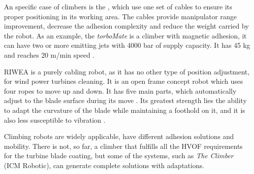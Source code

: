 


An specific case of climbers is the , which use one set of
cables to ensure its proper positioning in its working area. The cables provide
manipulator range improvement, decrease the adhesion complexity and reduce the
weight carried by the robot. As an example, the \textit{torboMate} is a climber
with magnetic adhesion, it can have two or more emitting jets with 4000 bar of
supply capacity. It has 45 kg and reaches 20 m/min speed \citep{torbo}.

RIWEA is a purely cabling robot, as it has no other type of position
adjustment, for wind power turbines cleaning. It is an open frame concept robot
which uses four ropes to move up and down. It has five main parts, which
automatically adjust to the blade surface during its move
\citep{jeon2012maintenance}. Its greatest strength lies the ability to adapt the
curvature of the blade while maintaining a foothold on it, and it is also less
susceptible to vibration \citep{riwea}.

Climbing robots are widely applicable, have different adhesion solutions and
mobility. There is not, so far, a climber that fulfills all the HVOF
requirements for the turbine blade coating, but some of the systems, such as
\emph{The Climber} (ICM Robotic), can generate complete solutions with
adaptations.

